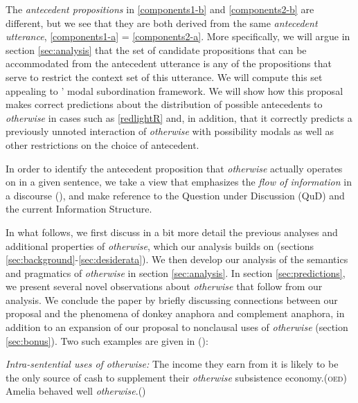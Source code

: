 The \textit{antecedent propositions} in \ref{components1-b} and \ref{components2-b} are different, but we see that they are both derived from the same \textit{antecedent utterance}, \ref{components1-a} = \ref{components2-a}. More specifically, we will argue in section \ref{sec:analysis} that the set of candidate propositions that can be accommodated from the antecedent utterance is any of the propositions that serve to restrict the context set of this utterance. We will compute this set appealing to \citeauthor{Roberts1989}' modal subordination framework. We will show how this proposal makes correct predictions about the distribution of possible antecedents to \textit{otherwise} in cases such as \ref{redlightR} and, in addition, that it correctly predicts a previously unnoted interaction of \textit{otherwise} with possibility modals as well as other restrictions on the choice of antecedent.

In order to identify the antecedent proposition that \textit{otherwise} actually operates on in a given sentence, we take a view that emphasizes the \textit{flow of information} in a discourse (\citealp[see also][]{Roberts2012}), and make reference to the Question under Discussion (QuD) and the current Information Structure. 


In what follows, we first discuss in a bit more detail the previous analyses and additional properties of \textit{otherwise}, which our analysis builds on (sections \ref{sec:background}-\ref{sec:desiderata}). We then develop our analysis of the semantics and pragmatics of \textit{otherwise} in section \ref{sec:analysis}. In section \ref{sec:predictions}, we present several novel observations about \textit{otherwise} that follow from our analysis. We conclude the paper by briefly discussing connections between our proposal and the phenomena of donkey anaphora and complement anaphora, in addition to an expansion of our proposal to nonclausal uses of \textit{otherwise} (section \ref{sec:bonus}).  Two such examples are given in (\nextx):

\pex \label{internal-intro} \emph{Intra-sentential uses of \emph{otherwise}: }
\a  The income they earn from it is likely to be the only source of cash to supplement their \textit{otherwise} subsistence economy.\hfill(\textsc{oed})
\a  \label{amelia} Amelia behaved well \textit{otherwise}.\hspace*{\fill}(\citealt{Flament-Boistrancourt2011}\footnotemark{})\xe



